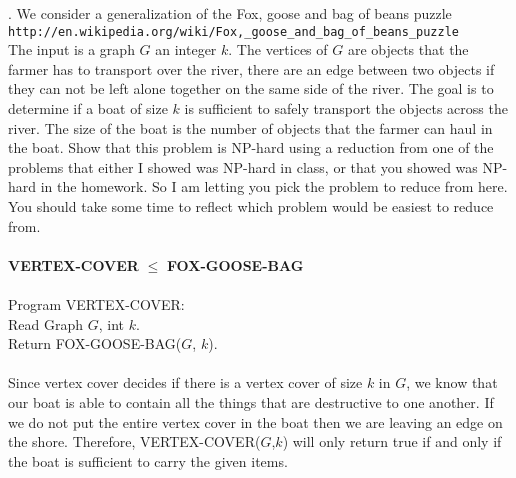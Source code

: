 \documentclass[10pt]{article}
\newcommand{\tab}{\hspace*{2em}}
\begin{document}
. We consider a generalization of the Fox, goose and bag of beans puzzle\\
\verb=http://en.wikipedia.org/wiki/Fox,_goose_and_bag_of_beans_puzzle= \\
The input is a graph $G$ an integer $k$. The vertices of $G$ are objects that the farmer has to transport
over the river, there are an edge between two objects if they can not be left alone together on the same
side of the river. The goal is to determine if a boat of size $k$ is sufficient to safely transport the objects
across the river. The size of the boat is the number of objects that the farmer can haul in the boat.
Show that this problem is NP-hard using a reduction from one of the problems that either I showed
was NP-hard in class, or that you showed was NP-hard in the homework. So I am letting you pick the
problem to reduce from here. You should take some time to reflect which problem would be easiest to
reduce from.\\
\\
\textbf{VERTEX-COVER} $\leq$ \textbf{FOX-GOOSE-BAG}\\
\\
Program VERTEX-COVER:\\
\tab Read Graph $G$, int $k$.\\
\tab Return FOX-GOOSE-BAG($G$, $k$).\\
\\
Since vertex cover decides if there is a vertex cover of size $k$ in $G$, we know that 
our boat is able to contain all the things that are destructive to one another. If we do
not put the entire vertex cover in the boat then we are leaving an edge on the shore. Therefore,
VERTEX-COVER($G$,$k$) will only return true if and only if the boat is sufficient to carry the given
items. 
\end{document}
